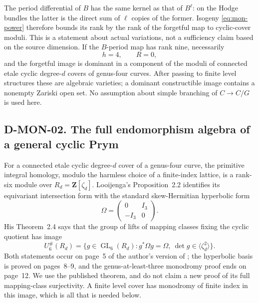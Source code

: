 The period differential of $B$ has the same kernel as that of $B^\ell$:
on the Hodge bundles the latter is the direct sum of $\ell$ copies of the
former. Isogeny \eqref{eq:mon-power} therefore bounds its rank by the
rank of the forgetful map to cyclic-cover moduli. This is a statement
about actual variations, not a sufficiency claim based on the source
dimension. If the $B$-period map has rank nine, necessarily
\begin{equation}\label{eq:mon-equality}
                  h=4,\qquad R=0,
\end{equation}
and the forgetful image is dominant in a component of the moduli of
connected etale cyclic degree-$d$ covers of genus-four curves. After
passing to finite level structures these are algebraic varieties; a
dominant constructible image contains a nonempty Zariski open set.
No assumption about simple branching of $C\to C/G$ is used here.

\subsection*{D-MON-02. The full endomorphism algebra of a general cyclic Prym}

For a connected etale cyclic degree-$d$ cover of a genus-four curve, the
primitive integral homology, modulo the harmless choice of a finite-index
lattice, is a rank-six module over $R_d=\mathbf Z[\zeta_d]$.
Looijenga's Proposition~2.2 identifies its equivariant intersection form
with the standard skew-Hermitian hyperbolic form
\[
               \Omega=\begin{pmatrix}0&I_3\\-I_3&0\end{pmatrix}.
\]
His Theorem~2.4 says that the group of lifts of mapping classes fixing
the cyclic quotient has image
\[
 U_6^\#(R_d)=
 \{g\in\operatorname{GL}_6(R_d):g^*\Omega g=\Omega,
                       \ \det g\in\langle\zeta_d^2\rangle\}.
\]
Both statements occur on page~5 of the author's version of
\cite{IM:Looijenga1997}; the hyperbolic basis is proved on pages~8--9,
and the genus-at-least-three monodromy proof ends on page~12.
We use the published theorem, and do not claim a new proof of its full
mapping-class surjectivity. A finite level cover has monodromy of finite
index in this image, which is all that is needed below.


